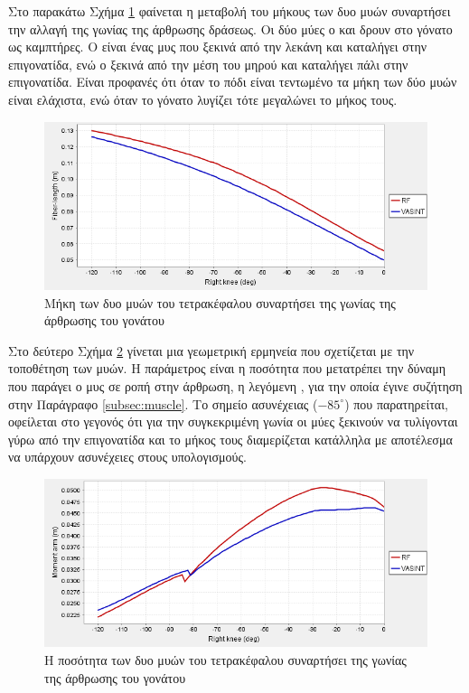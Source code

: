 Στο παρακάτω Σχήμα \ref{fig:iber-length-vs-knee-angle} φαίνεται η μεταβολή του μήκους των δυο μυών συναρτήσει την αλλαγή της γωνίας της άρθρωσης δράσεως. Οι δύο μύες ο  και  δρουν στο γόνατο ως καμπτήρες. Ο  είναι ένας μυς που ξεκινά από την λεκάνη και καταλήγει στην επιγονατίδα, ενώ  ο  ξεκινά από την μέση του μηρού και καταλήγει πάλι στην επιγονατίδα. Είναι προφανές ότι όταν το πόδι είναι τεντωμένο τα μήκη των δύο μυών είναι ελάχιστα, ενώ όταν το γόνατο λυγίζει τότε μεγαλώνει το μήκος τους.

\begin{figure}[H]
    \centering
    \includegraphics[width=0.8\linewidth, keepaspectratio]{fig/fiber-length-vs-knee-angle.png}
    \caption{Μήκη των δυο μυών του τετρακέφαλου συναρτήσει της γωνίας της άρθρωσης του γονάτου}
    \label{fig:iber-length-vs-knee-angle}
\end{figure}

Στο δεύτερο Σχήμα \ref{fig:moment-arm-vs-knee-angle} γίνεται μια γεωμετρική ερμηνεία που σχετίζεται με την τοποθέτηση των μυών. Η παράμετρος είναι η ποσότητα που μετατρέπει την δύναμη που παράγει ο μυς σε ροπή στην άρθρωση, η λεγόμενη , για την οποία έγινε συζήτηση στην Παράγραφο \ref{subsec:muscle}. Το σημείο ασυνέχειας ($-85^{\circ}$) που παρατηρείται, οφείλεται στο γεγονός ότι για την συγκεκριμένη γωνία οι μύες ξεκινούν να τυλίγονται γύρω από την επιγονατίδα και το μήκος τους διαμερίζεται κατάλληλα με αποτέλεσμα να υπάρχουν ασυνέχειες στους υπολογισμούς.

\begin{figure}[H]
    \centering
    \includegraphics[width=0.8\linewidth, keepaspectratio]{fig/moment-arm-vs-knee-angle.png}
    \caption{Η ποσότητα  των δυο μυών του τετρακέφαλου συναρτήσει της γωνίας της άρθρωσης του γονάτου}
    \label{fig:moment-arm-vs-knee-angle}
\end{figure}

